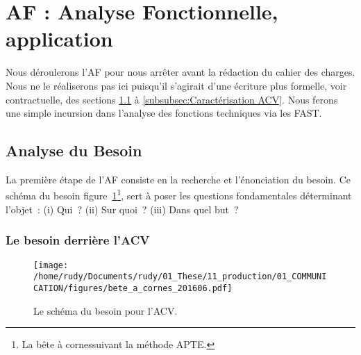 \section{AF : Analyse Fonctionnelle, application}

Nous déroulerons l'\gls{AF} pour nous arrêter avant la rédaction du cahier des charges.
Nous ne le réaliserons pas ici puisqu'il s'agirait d'une écriture plus formelle, voir contractuelle, des sections \ref{subsec:besoin} à \ref{subsubsec:Caractérisation ACV}.
Nous ferons une simple incursion dans l'analyse des fonctions techniques via les \gls{FAST}.



\subsection{Analyse du Besoin}
\label{subsec:besoin}
La première étape de l'\gls{AF} consiste en la recherche et l'énonciation du besoin.
Ce schéma du besoin figure~\ref{fig:diagramme_besoin}\footnote{La bête à cornes\textcopyright suivant la méthode APTE\textregistered.}, sert à poser les questions fondamentales déterminant l'objet~: (i) Qui~? (ii) Sur quoi~? (iii) Dans quel but~?
\subsubsection{Le besoin derrière l'ACV}
\begin{figure}[htbp]
\centering
\texttt{[image: /home/rudy/Documents/rudy/01\_These/11\_production/01\_COMMUNICATION/figures/bete\_a\_cornes\_201606.pdf]}
\caption{Le schéma du besoin pour l'\gls{ACV}.}
\label{fig:diagramme_besoin}
\end{figure}


